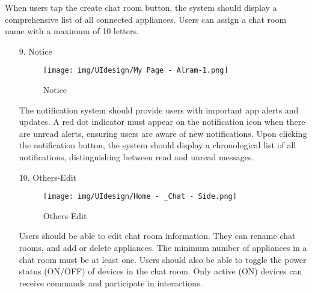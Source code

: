 \documentclass[conference]{IEEEtran}
\begin{document}
\begin{enumerate}
\begin{itemize}
\begin{itemize}
\begin{enumerate}
\begin{enumerate}
    When users tap the create chat room button, the system should display a comprehensive list of all connected appliances. Users can assign a chat room name with a maximum of 10 letters.\\
\end{enumerate}

\begin{enumerate}
    \item[9.] Notice
    \begin{figure}[h]
        {\centering
        \hspace{4cm}
        \begin{minipage}{0.4\columnwidth}
            \texttt{[image: img/UIdesign/My Page - Alram-1.png]}
            \caption{Notice}
        \end{minipage}}
    \end{figure}
    
    The notification system should provide users with important app alerts and updates. A red dot indicator must appear on the notification icon when there are unread alerts, ensuring users are aware of new notifications. Upon clicking the notification button, the system should display a chronological list of all notifications, distinguishing between read and unread messages.\\
\end{enumerate}

\begin{enumerate}
    \item[10.] Others-Edit
    \begin{figure}[h]
        {\centering
        \hspace{4cm}
        \begin{minipage}{0.4\columnwidth}
            \texttt{[image: img/UIdesign/Home - \_Chat - Side.png]}
            \caption{Others-Edit}
        \end{minipage}}
    \end{figure}
    
    Users should be able to edit chat room information. They can rename chat rooms, and add or delete appliances. The minimum number of appliances in a chat room must be at least one. Users should also be able to toggle the power status (ON/OFF) of devices in the chat room. Only active (ON) devices can receive commands and participate in interactions. \\
\end{enumerate}


\end{enumerate}
\end{itemize}
\end{itemize}
\end{enumerate}
\end{document}
